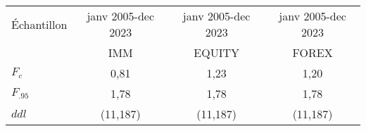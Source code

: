\begin{tabular}{lccc}
\toprule
Échantillon & janv 2005-dec 2023 & janv 2005-dec 2023 & janv 2005-dec 2023 \\
      &  IMM &  EQUITY & FOREX \\  
\cmidrule(r){1-1} \cmidrule(lr){2-2}\cmidrule(l){3-3} \cmidrule(l){4-4}
    $F_c$        &  0,81    &  1,23 & 1,20    \\
    $F_{.95}$    & 1,78     &  1,78    &  1,78 \\
    $ddl$        & (11,187)     &  (11,187) & (11,187)       \\ 
\bottomrule
\end{tabular}